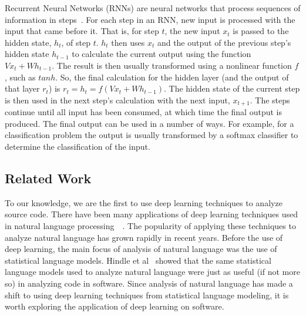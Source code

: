 Recurrent Neural Networks (RNNs) are neural networks that process sequences of information in steps~\cite{elman1990finding}. For each step in an RNN, new input is processed with the input that came before it. That is, for step $t$, the new input $x_t$ is passed to the hidden state, $h_t$, of step $t$. $h_t$ then uses $x_t$ and the output of the previous step's hidden state $h_{t-1}$ to calculate the current output using the function $Vx_t + Wh_{t-1}$. The result is then usually transformed using a nonlinear function $f$, such as $tanh$. So, the final calculation for the hidden layer (and the output of that layer $r_t$) is $r_t = h_t = f(Vx_t + Wh_{t-1})$. The hidden state of the current step is then used in the next step's calculation with the next input, $x_{t+1}$. The steps continue until all input has been consumed, at which time the final output is produced. The final output can be used in a number of ways. For example, for a classification problem the output is usually transformed by a softmax classifier to determine the classification of the input. 

\subsection{Related Work}

To our knowledge, we are the first to use deep learning techniques to analyze source code. There have been many applications of deep learning techniques used in natural language processing~\cite{collobert2008unified}~\cite{glorot2011domain}. The popularity of applying these techniques to analyze natural language has grown rapidly in recent years. Before the use of deep learning, the main focus of analysis of natural language was the use of statistical language models. Hindle et al~\cite{hindle2012naturalness} showed that the same statistical language models used to analyze natural language were just as useful (if not more so) in analyzing code in software. Since analysis of natural language has made a shift to using deep learning techniques from statistical language modeling, it is worth exploring the application of deep learning on software.

